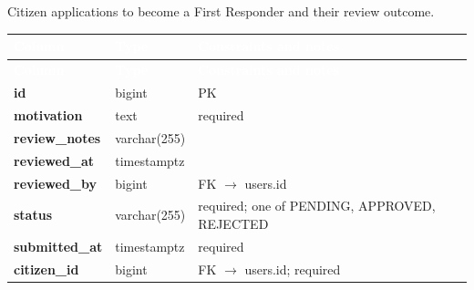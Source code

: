 \subsection*{}
Citizen applications to become a First Responder and their review outcome.\par\vspace{2pt}
{\tabfont\rowband
\begin{longtable}{@{}>{\raggedright\arraybackslash}p{}>{\raggedright\arraybackslash}p{}>{\raggedright\arraybackslash}p{}@{}}
\rowcolor{najdanavy}\textcolor{white}{\sffamily\bfseries\small Column} & \textcolor{white}{\sffamily\bfseries\small Type} & \textcolor{white}{\sffamily\bfseries\small Constraints and notes}\\
\endfirsthead
\rowcolor{najdanavy}\textcolor{white}{\sffamily\bfseries\small Column} & \textcolor{white}{\sffamily\bfseries\small Type} & \textcolor{white}{\sffamily\bfseries\small Constraints and notes}\\
\endhead
\bottomrule\endlastfoot
\textbf{id} & bigint & PK\\
\textbf{motivation} & text & required\\
\textbf{review\_\allowbreak{}notes} & varchar(255) & \\
\textbf{reviewed\_\allowbreak{}at} & timestamptz & \\
\textbf{reviewed\_\allowbreak{}by} & bigint & FK $\rightarrow$ users.id\\
\textbf{status} & varchar(255) & required; one of PENDING, APPROVED, REJECTED\\
\textbf{submitted\_\allowbreak{}at} & timestamptz & required\\
\textbf{citizen\_\allowbreak{}id} & bigint & FK $\rightarrow$ users.id; required\\
\end{longtable}}

